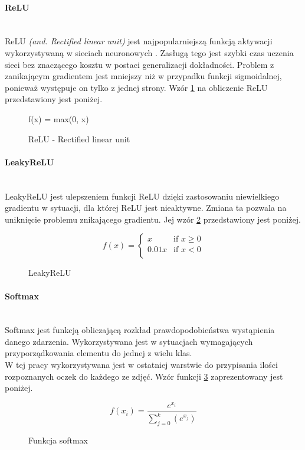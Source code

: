 \paragraph{ReLU} \mbox{}\\
ReLU \textit{(and. Rectified linear unit)} jest najpopularniejszą funkcją
aktywacji wykorzystywaną w sieciach neuronowych \cite{CS231n_activ, WIKIrectifier}.
Zasługą tego jest szybki czas uczenia sieci bez znaczącego kosztu w postaci generalizacji
dokładności. Problem z zanikającym gradientem jest mniejszy niż w przypadku funkcji
sigmoidalnej, ponieważ występuje on tylko z jednej strony.
Wzór \ref{eq:relu} na obliczenie ReLU przedstawiony jest poniżej.
\begin{figure}[h!]
\renewcommand{\figurename}{Wzór}%
\begin{equation**}
f(x) = max(0, x)
\end{equation**}
\caption{ReLU - Rectified linear unit}
\label{eq:relu}
\end{figure}

\paragraph{LeakyReLU} \mbox{}\\
LeakyReLU jest ulepszeniem funkcji ReLU \cite{CS231n_activ} dzięki zastosowaniu niewielkiego
gradientu w sytuacji, dla której ReLU jest nieaktywne. Zmiana ta pozwala na uniknięcie
problemu znikającego gradientu. Jej wzór \ref{eq:leakyrelu} przedstawiony jest poniżej.
\begin{figure}[h!]
\renewcommand{\figurename}{Wzór}%
\begin{equation*}
f(x) =
\begin{cases}
x & \text{if } x \geqslant 0 \\
0.01x & \text{if } x < 0 \\
\end{cases}
\end{equation*}
\caption{LeakyReLU}
\label{eq:leakyrelu}
\end{figure}

\paragraph{Softmax} \mbox{}\\
Softmax jest funkcją obliczającą rozkład prawdopodobieństwa wystąpienia danego zdarzenia.
Wykorzystywana jest w sytuacjach wymagających przyporządkowania
elementu do jednej z wielu klas. \\W tej pracy wykorzystywana jest w ostatniej warstwie do
przypisania ilości rozpoznanych oczek do każdego ze zdjęć. Wzór funkcji \ref{eq:softmax} zaprezentowany jest poniżej.
\begin{figure}[h!]
\renewcommand{\figurename}{Wzór}%
\begin{equation*}
f(x_{i}) = \frac{e^{x_{i}}} {\sum_{j = 0}^{k}(e^{x_{j}})}
\end{equation*}
\caption{Funkcja softmax}
\label{eq:softmax}
\end{figure}

